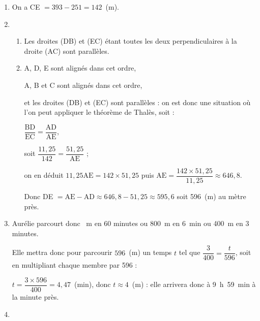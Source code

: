 \begin{enumerate}
	\item %
On a CE $ = 393 - 251 = 142$~(m).	
	\item \begin{enumerate}
		\item %
Les droites (DB) et (EC) étant toutes les deux perpendiculaires à la droite (AC) sont parallèles.
		\item %
A, D, E sont alignés dans cet ordre,

A, B et C sont alignés dans cet ordre,

et les droites (DB) et (EC) sont parallèles : on est donc une situation où l'on peut appliquer le théorème de Thalès, soit :

$\dfrac{\text{BD}}{\text{EC}} = \dfrac{\text{AD}}{\text{AE}}$,

soit $\dfrac{11,25}{142} = \dfrac{51,25}{\text{AE}}$ ;

on en déduit $11,25\text{AE} = 142 \times 51,25$ puis $\text{AE} = \dfrac{142 \times 51,25}{11,25}\approx 646,8$.

Donc DE $= \text{AE} - \text{AD} \approx 646,8 - 51,25 \approx 595,6$ soit 596~(m) au mètre près. 
	\end{enumerate}
\item %
	
Aurélie parcourt donc ~m en 60 minutes ou 800~m en 6~min ou 400~m en 3 minutes.

Elle mettra donc pour parcourir $596$~(m) un temps $t$ tel que $\dfrac{3}{400} = \dfrac{t}{596}$, soit en multipliant chaque membre par 596 :

$t = \dfrac{3 \times 596}{400} = 4,47$~(min), donc $t \approx 4$~(m) : elle arrivera donc à 9~h~59~min à la minute près.	
\item %
	

\end{enumerate}
